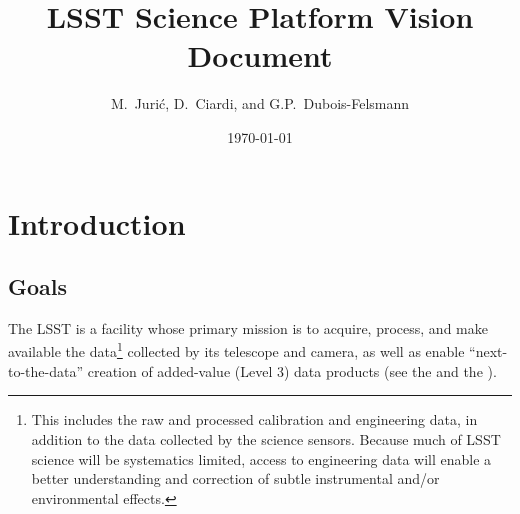 \documentclass[DM,lsstdraft,toc]{lsstdoc}
\title[LSST Science Platform]{LSST Science Platform Vision Document}
\author{
M.~Juri\'c,
D.~Ciardi,
and
G.P.~Dubois-Felsmann
}
\date{\today}
\begin{document}
\maketitle

%
%
%
%

\section{Introduction}

\subsection{Goals}

The LSST is a facility whose primary mission is to acquire, process, and
make available the data\footnote{This includes the raw and processed calibration and engineering data, in addition to the data collected by the science sensors. Because much of LSST science will be systematics limited, access to engineering data will enable a better understanding and correction of subtle instrumental and/or environmental effects.} collected by its telescope and camera, as well as enable ``next-to-the-data'' creation of added-value (Level 3) data products
(see the \SRD and the \LSR).
\end{document}
